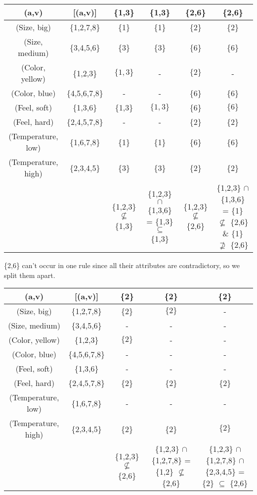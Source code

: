 \documentclass[10pt]{amsart}
\newcommand{\hl}[1]{%
  \colorbox{red!50}{$\displaystyle#1$}}
\begin{document}
\begin{center}
\begin{tabular}{ | c | c | c | c ||| c | c !{\vrule width 1pt } !{\vrule width 1pt}}
\hline
(a,v) & [(a,v)] & \{1,3\} & \{1,3\} & \{2,6\}&\{2,6\} \\
\hline
(Size, big) & \{1,2,7,8\}&\{1\}&\{1\} &\{2\}&\{2\} \\ 
(Size, medium) & \{3,4,5,6\}&\{3\}&\{3\} &\{6\}&\{6\}\\  
(Color, yellow) & \{1,2,3\}&\hl{\{1,3\}}&- &\hl{\{2\}}&- \\  
(Color, blue) & \{4,5,6,7,8\}&-&- &\{6\}&\{6\}  \\ 
(Feel, soft) & \{1,3,6\}&\{1,3\}&\hl{\{1,3\}} &\{6\}&\hl{\{6\}} \\ 
(Feel, hard) & \{2,4,5,7,8\}&-&- &\{2\}&\{2\} \\ 
(Temperature, low) & \{1,6,7,8\}&\{1\}&\{1\} &\{6\}&\{6\} \\
(Temperature, high) & \{2,3,4,5\}&\{3\}&\{3\} &\{2\}&\{2\} \\
\hline 
&& \{1,2,3\} $\nsubseteq$ \{1,3\} & \{1,2,3\} $\cap$ \{1,3,6\} = \{1,3\} $\subseteq$ \{1,3\} & \{1,2,3\} $\nsubseteq$ \{2,6\} & \{1,2,3\} $\cap$ \{1,3,6\} = \{1\} $\nsubseteq$ \{2,6\} \& \{1\} $\nsupseteq$ \{2,6\}
\end{tabular}

\{2,6\} can't occur in one rule since all their attributes are contradictory, so we split them apart.

\begin{tabular}{ | c | c !{\vrule width 1pt } !{\vrule width 1pt} c | c | c !{\vrule width 1pt } !{\vrule width 1pt}}
\hline
(a,v) & [(a,v)] & \{2\}&\{2\}&\{2\}\\
\hline
(Size, big) & \{1,2,7,8\}        & \{2\}      & \hl{\{2\}} & -\\ 
(Size, medium) & \{3,4,5,6\}     & -          & -          & -\\  
(Color, yellow) & \{1,2,3\}      & \hl{\{2\}} & -          & -\\  
(Color, blue) & \{4,5,6,7,8\}    & -          & -          & -\\ 
(Feel, soft) & \{1,3,6\}         & -          & -          & -\\ 
(Feel, hard) & \{2,4,5,7,8\}     & \{2\}      & \{2\}      & \{2\}\\ 
(Temperature, low) &\{1,6,7,8\}  & -          & -          & -\\
(Temperature, high) & \{2,3,4,5\}& \{2\}      & \{2\}      & \hl{\{2\}}\\
\hline 
&& \{1,2,3\} $\nsubseteq$ \{2,6\} & \{1,2,3\} $\cap$ \{1,2,7,8\} = \{1,2\} $\nsubseteq$ \{2,6\} & \{1,2,3\} $\cap$ \{1,2,7,8\} $\cap$ \{2,3,4,5\} = \{2\} $\subseteq$ \{2,6\}
\end{tabular}


\end{center}
\end{document}

